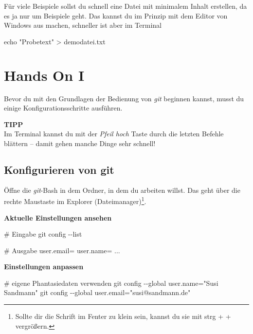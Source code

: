 \documentclass[
  letterpaper,
  DIV=11]{scrreprt}
\newenvironment{Shaded}{\begin{snugshade}}{\end{snugshade}}
\newcommand{\AttributeTok}[1]{\textcolor[rgb]{0.40,0.45,0.13}{#1}}
\newcommand{\BuiltInTok}[1]{\textcolor[rgb]{0.00,0.23,0.31}{#1}}
\newcommand{\CommentTok}[1]{\textcolor[rgb]{0.37,0.37,0.37}{#1}}
\newcommand{\ExtensionTok}[1]{\textcolor[rgb]{0.00,0.23,0.31}{#1}}
\newcommand{\FunctionTok}[1]{\textcolor[rgb]{0.28,0.35,0.67}{#1}}
\newcommand{\NormalTok}[1]{\textcolor[rgb]{0.00,0.23,0.31}{#1}}
\newcommand{\OperatorTok}[1]{\textcolor[rgb]{0.37,0.37,0.37}{#1}}
\newcommand{\StringTok}[1]{\textcolor[rgb]{0.13,0.47,0.30}{#1}}
\newcommand{\git}{\textit{git}\xspace}
\newcommand{\strg}[1]{strg + #1\xspace}
\begin{document}
Für viele Beispiele sollst du schnell eine Datei mit minimalem Inhalt
erstellen, da es ja nur um Beispiele geht. Das kannst du im Prinzip mit
dem Editor von Windows aus machen, schneller ist aber im Terminal

\begin{Shaded}
\begin{Highlighting}[]
\BuiltInTok{echo} \StringTok{"Probetext"} \OperatorTok{\textgreater{}}\NormalTok{ demodatei.txt }
\end{Highlighting}
\end{Shaded}


\chapter{Hands On I}\label{hands-on-i}

Bevor du mit den Grundlagen der Bedienung von \git  beginnen kannst,
musst du einige Konfigurationsschritte ausführen.

\samplestart

\textbf{TIPP}\\
Im Terminal kannst du mit der \emph{Pfeil hoch} Taste durch die letzten
Befehle blättern -- damit gehen manche Dinge sehr schnell! \sampleend

\section{Konfigurieren von git}\label{konfigurieren-von-git}

Öffne die \git-Bash in dem Ordner, in dem du arbeiten willst. Das geht
über die rechte Maustaste im Explorer (Dateimanager)\footnote{Sollte dir
  die Schrift im Fenter zu klein sein, kannst du sie mit \strg{+}
  vergrößern.}.

\textbf{Aktuelle Einstellungen ansehen}

\begin{Shaded}
\begin{Highlighting}[]
\CommentTok{\# Eingabe}
\FunctionTok{git}\NormalTok{ config }\AttributeTok{{-}{-}list}

\CommentTok{\# Ausgabe}
\ExtensionTok{user.email=}
\ExtensionTok{user.name=}
     \ExtensionTok{...}
\end{Highlighting}
\end{Shaded}

\textbf{Einstellungen anpassen}

\begin{Shaded}
\begin{Highlighting}[]
\CommentTok{\# eigene Phantasiedaten verwenden}
\FunctionTok{git}\NormalTok{ config }\AttributeTok{{-}{-}global}\NormalTok{ user.name=}\StringTok{"Susi Sandmann"} 
\FunctionTok{git}\NormalTok{ config }\AttributeTok{{-}{-}global}\NormalTok{ user.email=}\StringTok{"susi@sandmann.de"}
\end{Highlighting}
\end{Shaded}
\end{document}
